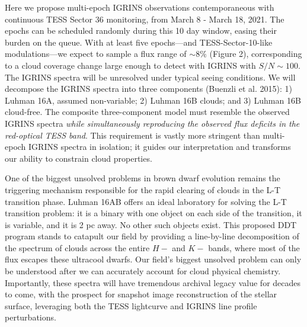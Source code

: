 \documentclass[11pt]{article}
\begin{document}
{Here we propose multi-epoch IGRINS observations contemporaneous with continuous TESS Sector 36 monitoring, from March 8 - March 18, 2021.  The epochs can be scheduled randomly during this 10 day window, easing their burden on the queue.  With at least five epochs---and TESS-Sector-10-like modulations---we expect to sample a flux range of $\sim 8\%$ (Figure 2), corresponding to a cloud coverage change large enough to detect with IGRINS with $S/N\sim100$.  The IGRINS spectra will be unresolved under typical seeing conditions.  We will decompose the IGRINS spectra into three components (Buenzli et al. 2015): 1) Luhman 16A, assumed non-variable; 2) Luhman 16B clouds; and 3) Luhman 16B cloud-free.  The composite three-component model must resemble the observed IGRINS spectra \emph{while simultaneously reproducing the observed flux deficits in the red-optical TESS band}.  This requirement is vastly more stringent than multi-epoch IGRINS spectra in isolation; it guides our interpretation and transforms our ability to constrain cloud properties. 

One of the biggest unsolved problems in brown dwarf evolution remains the triggering mechanism responsible for the rapid clearing of clouds in the L-T transition phase.  Luhman 16AB offers an ideal laboratory for solving the L-T transition problem: it is a binary with one object on each side of the transition, it is variable, and it is 2 pc away. No other such objects exist. This proposed DDT program stands to catapult our field by providing a line-by-line decomposition of the spectrum of clouds across the entire $H-$ and $K-$ bands, where most of the flux escapes these ultracool dwarfs.  Our field's biggest unsolved problem can only be understood after we can accurately account for cloud physical chemistry.  Importantly, these spectra will have tremendous archival legacy value for decades to come, with the prospect for snapshot image reconstruction of the stellar surface, leveraging both the TESS lightcurve and IGRINS line profile perturbations.




\clearpage

}
\end{document}
